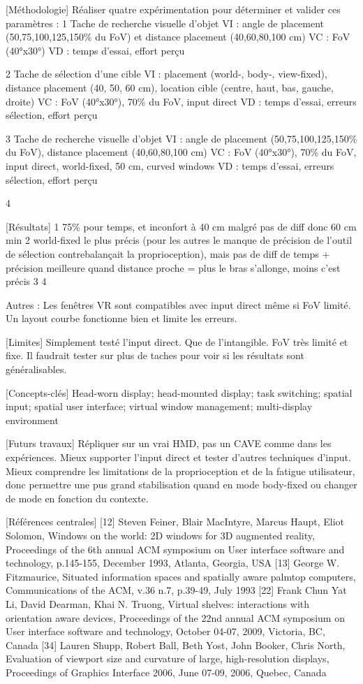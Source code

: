[Méthodologie]
Réaliser quatre expérimentation pour déterminer et valider ces paramètres :
1 Tache de recherche visuelle d'objet
VI : angle de placement (50,75,100,125,150\% du FoV) et distance placement (40,60,80,100 cm)
VC : FoV (40°x30°)
VD : temps d'essai, effort perçu

2 Tache de sélection d'une cible
VI : placement (world-, body-, view-fixed), distance placement (40, 50, 60 cm), location cible (centre, haut, bas, gauche, droite)
VC : FoV (40°x30°), 70\% du FoV, input direct
VD : temps d'essai, erreurs sélection, effort perçu

3 Tache de recherche visuelle d'objet
VI : angle de placement (50,75,100,125,150\% du FoV), distance placement (40,60,80,100 cm)
VC : FoV (40°x30°), 70\% du FoV, input direct, world-fixed, 50 cm, curved windows
VD : temps d'essai, erreurs sélection, effort perçu

4

[Résultats]
1 75\% pour temps, et inconfort à 40 cm malgré pas de diff donc 60 cm min
2 world-fixed le plus précis (pour les autres le manque de précision de l'outil de sélection contrebalançait la proprioception), mais pas de diff de temps + précision meilleure quand distance proche = plus le bras s'allonge, moins c'est précis
3
4

Autres : Les fenêtres VR sont compatibles avec input direct même si FoV limité. Un layout courbe fonctionne bien et limite les erreurs.

[Limites]
Simplement testé l'input direct. Que de l'intangible. FoV très limité et fixe. Il faudrait tester sur plus de taches pour voir si les résultats sont généralisables.

[Concepts-clés]
Head-worn display; head-mounted display; task switching; spatial input; spatial user interface; virtual window management; multi-display environment

[Futurs travaux]
Répliquer sur un vrai HMD, pas un CAVE comme dans les expériences. Mieux supporter l'input direct et tester d'autres techniques d'input. Mieux comprendre les limitations de la proprioception et de la fatigue utilisateur, donc permettre une pus grand stabilisation quand en mode body-fixed ou changer de mode en fonction du contexte.

[Références centrales]
[12] Steven Feiner, Blair MacIntyre, Marcus Haupt, Eliot Solomon, Windows on the world: 2D windows for 3D augmented reality, Proceedings of the 6th annual ACM symposium on User interface software and technology, p.145-155, December 1993, Atlanta, Georgia, USA
[13] George W. Fitzmaurice, Situated information spaces and spatially aware palmtop computers, Communications of the ACM, v.36 n.7, p.39-49, July 1993
[22] Frank Chun Yat Li, David Dearman, Khai N. Truong, Virtual shelves: interactions with orientation aware devices, Proceedings of the 22nd annual ACM symposium on User interface software and technology, October 04-07, 2009, Victoria, BC, Canada
[34] Lauren Shupp, Robert Ball, Beth Yost, John Booker, Chris North, Evaluation of viewport size and curvature of large, high-resolution displays, Proceedings of Graphics Interface 2006, June 07-09, 2006, Quebec, Canada

